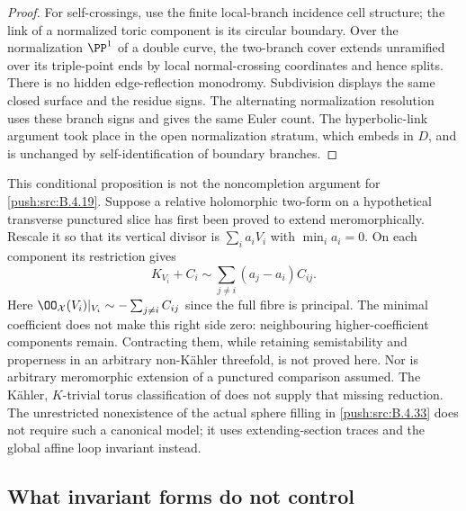 \begin{proof}
For self-crossings, use the finite local-branch
incidence cell structure; the link of a normalized
toric component is its circular boundary. Over the
normalization $\PP^1$ of a double curve, the two-branch
cover extends unramified over its triple-point ends
by local normal-crossing coordinates and hence splits.
There is no hidden edge-reflection monodromy. Subdivision
displays the same closed surface and the residue signs.
The alternating normalization resolution uses these
branch signs and gives the same Euler count. The
hyperbolic-link argument took place in the open
normalization stratum, which embeds in $D$, and is
unchanged by self-identification of boundary branches.
\end{proof}

\begin{remark}
This conditional proposition is not the noncompletion
argument for \ref{push:src:B.4.19}. Suppose a relative holomorphic two-form
on a hypothetical transverse punctured slice has first
been proved to extend meromorphically. Rescale it so
that its vertical divisor is $\sum_i a_iV_i$ with
$\min_i a_i=0$. On each component its restriction gives
\[
 K_{V_i}+C_i\sim\sum_{j\ne i}(a_j-a_i)C_{ij}.          \tag{B.4.28.11}
\]
Here $\OO_{\mathcal X}(V_i)|_{V_i}\sim
-\sum_{j\ne i}C_{ij}$ since the full fibre is principal.
The minimal coefficient does not make this right side
zero: neighbouring higher-coefficient components remain.
Contracting them, while retaining semistability and
properness in an arbitrary non-K\"ahler threefold, is
not proved here. Nor is arbitrary meromorphic extension
of a punctured comparison assumed. The K\"ahler,
$K$-trivial torus classification of
\citet[Theorem 3.1]{KamenovaToriRoot} does not supply
that missing reduction. The unrestricted nonexistence
of the actual sphere filling in \ref{push:src:B.4.33} does not require
such a canonical model; it uses extending-section traces
and the global affine loop invariant instead.
\end{remark}



\subsection{What invariant forms do not control}

